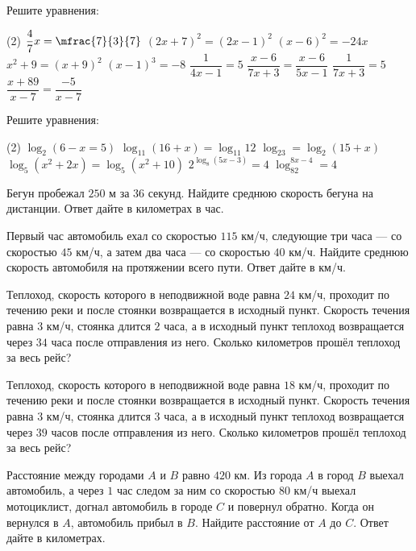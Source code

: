 \begin{class}[number=3]
	\begin{listofex}
		\item Решите уравнения:
		\begin{tasks}(2)
			\task \( \dfrac{4}{7}x=\mfrac{7}{3}{7} \)
			\task \( (2x+7)^2=(2x-1)^2 \)
			\task \( (x-6)^2=-24x \)
			\task \( x^2+9=(x+9)^2 \)
			\task \( (x-1)^3=-8 \)
			\task \( \dfrac{1}{4x-1}=5 \)
			\task \( \dfrac{x-6}{7x+3}=\dfrac{x-6}{5x-1} \)
			\task \( \dfrac{1}{7x+3}=5 \)
			\task \( \dfrac{x+89}{x-7}=\dfrac{-5}{x-7} \)
		\end{tasks}
		\item Решите уравнения:
		\begin{tasks}(2)
			\task \( \log_2(6-x=5) \)
			\task \( \log_{11}(16+x)=\log_{11}12 \)
			\task \( \log_23=\log_2(15+x) \)
			\task \( \log_5(x^2+2x)=\log_5(x^2+10) \)
			\task \( 2^{\log_8(5x-3)}=4 \)
			\task \( \log_82^{8x-4}=4 \)
		\end{tasks}
		\item Бегун пробежал \( 250 \) м за \( 36 \) секунд. Найдите среднюю скорость бегуна на дистанции. Ответ дайте в километрах в час.
		\item Первый час автомобиль ехал со скоростью \( 115 \) км/ч, следующие три часа --- со скоростью \( 45 \) км/ч, а затем два часа --- со скоростью \( 40 \) км/ч. Найдите среднюю скорость автомобиля на протяжении всего пути. Ответ дайте в км/ч.
		\item Теплоход, скорость которого в неподвижной воде равна \( 24 \) км/ч, проходит по течению реки и после стоянки возвращается в исходный пункт. Скорость течения равна \( 3 \) км/ч, стоянка длится \( 2 \) часа, а в исходный пункт теплоход возвращается через \( 34 \) часа после отправления из него. Сколько километров прошёл теплоход за весь рейс?
		\item Теплоход, скорость которого в неподвижной воде равна \( 18 \) км/ч, проходит по течению реки и после стоянки возвращается в исходный пункт. Скорость течения равна \( 3 \) км/ч, стоянка длится \( 3 \) часа, а в исходный пункт теплоход возвращается через \( 39 \) часов после отправления из него. Сколько километров прошёл теплоход за весь рейс?
		\item Расстояние между городами \( A \) и \( B \) равно \( 420 \) км. Из города \( A \) в город \( B \) выехал автомобиль, а через \( 1 \) час следом за ним со скоростью \( 80 \) км/ч выехал мотоциклист, догнал автомобиль в городе \( C \) и повернул обратно. Когда он вернулся в \( A \), автомобиль прибыл в \( B \). Найдите расстояние от \( A \) до \( C \). Ответ дайте в километрах.
	\end{listofex}
\end{class}

